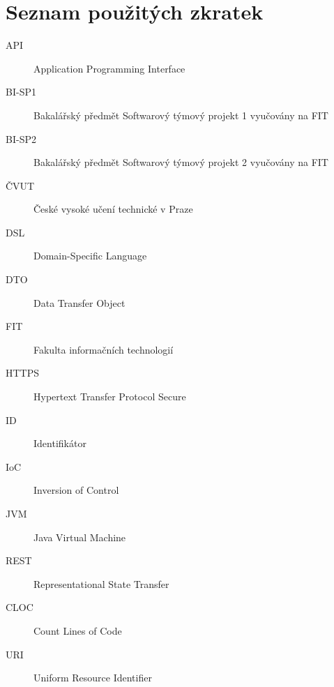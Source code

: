 \chapter{Seznam použitých zkratek}
\begin{description}
    \item[API] Application Programming Interface
    \item[BI-SP1] Bakalářský předmět Softwarový týmový projekt 1 vyučovány na FIT
    \item[BI-SP2] Bakalářský předmět Softwarový týmový projekt 2 vyučovány na FIT
    \item[ČVUT] České vysoké učení technické v Praze
    \item[DSL] Domain-Specific Language
    \item[DTO] Data Transfer Object
    \item[FIT] Fakulta informačních technologií
    \item[HTTPS] Hypertext Transfer Protocol Secure 
    \item[ID] Identifikátor
    \item[IoC] Inversion of Control
    \item[JVM] Java Virtual Machine
    \item[REST] Representational State Transfer
    \item[CLOC] Count Lines of Code
    \item[URI] Uniform Resource Identifier
\end{description}